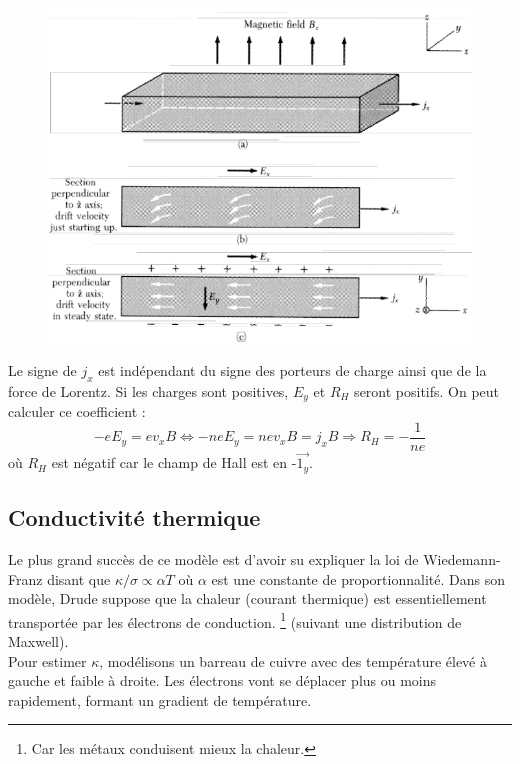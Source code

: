 \begin{figure}
	\vspace{-1cm}
	\includegraphics[scale=0.2]{ch2/image2.png}
\end{figure}
Le signe de $j_x$ est indépendant du signe des porteurs de charge ainsi que de la force
de Lorentz. Si les charges sont positives, $E_y$ et $R_H$ seront positifs. On peut 
calculer ce coefficient :
\begin{equation}
	-eE_y = ev_xB \Leftrightarrow -neE_y = nev_xB = j_xB \Longrightarrow R_H = -\frac{1}{ne}
\end{equation}
où $R_H$ est négatif car le champ de Hall est en -$\vec{1_y}$.



\newpage
\subsection{Conductivité thermique}
Le plus grand succès de ce modèle est d'avoir su expliquer la loi de 
Wiedemann-Franz disant que $\kappa/\sigma \propto \alpha T$ où $\alpha$ 
est une constante de proportionnalité. Dans son modèle, Drude suppose 
que la chaleur (courant thermique) est essentiellement transportée par
 les électrons de conduction.
\footnote{Car les métaux conduisent mieux la chaleur.} (suivant une 
distribution de Maxwell).\\
Pour estimer $\kappa$, modélisons un barreau de cuivre avec des température 
élevé à gauche et faible à droite. Les électrons vont se déplacer plus ou 
moins rapidement, formant un gradient de température. 

